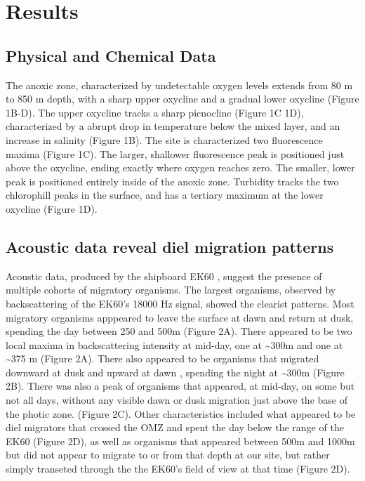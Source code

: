 \documentclass[]{article}
\begin{document}
\hypertarget{results}{%
\section{Results}\label{results}}

\hypertarget{physical-and-chemical-data}{%
\subsection{Physical and Chemical
Data}\label{physical-and-chemical-data}}

The anoxic zone, characterized by undetectable oxygen levels extends
from 80 m to 850 m depth, with a sharp upper oxycline and a gradual
lower oxycline (Figure 1B-D). The upper oxycline tracks a sharp
picnocline (Figure 1C 1D), characterized by a abrupt drop in temperature
below the mixed layer, and an increase in salinity (Figure 1B). The site
is characterized two fluorescence maxima (Figure 1C). The larger,
shallower fluorescence peak is positioned just above the oxycline,
ending exactly where oxygen reaches zero. The smaller, lower peak is
positioned entirely inside of the anoxic zone. Turbidity tracks the two
chlorophill peaks in the surface, and has a tertiary maximum at the
lower oxycline (Figure 1D).

\hypertarget{acoustic-data-reveal-diel-migration-patterns}{%
\subsection{Acoustic data reveal diel migration
patterns}\label{acoustic-data-reveal-diel-migration-patterns}}

Acoustic data, produced by the shipboard EK60 , suggest the presence of
multiple cohorts of migratory organisms. The largest organisms, observed
by backscattering of the EK60's 18000 Hz signal, showed the clearist
patterns. Most migratory organisms apppeared to leave the surface at
dawn and return at dusk, spending the day between 250 and 500m (Figure
2A). There appeared to be two local maxima in backscattering intensity
at mid-day, one at \textasciitilde{}300m and one at \textasciitilde{}375
m (Figure 2A). There also appeared to be organisms that migrated
downward at dusk and upward at dawn , spending the night at
\textasciitilde{}300m (Figure 2B). There was also a peak of organisms
that appeared, at mid-day, on some but not all days, without any visible
dawn or dusk migration just above the base of the photic zone. (Figure
2C). Other characteristics included what appeared to be diel migrators
that crossed the OMZ and spent the day below the range of the EK60
(Figure 2D), as well as organisms that appeared between 500m and 1000m
but did not appear to migrate to or from that depth at our site, but
rather simply transeted through the the EK60's field of view at that
time (Figure 2D).
\end{document}
